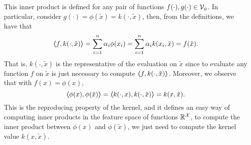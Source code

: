 %
This inner product is defined for any pair of functions $f(\cdot), g(\cdot) \in \mathcal{V}_\phi$. In particular, consider $g(\cdot) = \phi(\tilde{x}) = k(\cdot, \tilde{x})$, then, from the definitions, we have that
$$ \bm{\left\langle} f, k(\cdot, \tilde{x}) \bm{\right\rangle} = \sum_{i=1}^n \alpha_i \phi(x_i) =\sum_{i=1}^n \alpha_i k(x_i, \tilde{x}) = f(\tilde{x}) .$$
That is, $k(\cdot, \tilde{x})$ is the representative of the evaluation on $\tilde{x}$ since to evaluate any function $f$ on $\tilde{x}$ is just necessary to compute $\bm{\left\langle} f, k(\cdot, \tilde{x}) \bm{\right\rangle}$. Moreover, we observe that with $f(x) = \phi(x)$,
$$ \bm{\left\langle} \phi(x), \phi(\tilde{x}) \bm{\right\rangle} = \bm{\left\langle} k(\cdot, x), k(\cdot, \tilde{x}) \bm{\right\rangle} = k(x, \tilde{x}) .$$  
This is the reproducing property of the kernel, and it defines an easy way of computing inner products in the feature space of functions $\mathbb{R}^{\mathcal{X}}$, to compute the inner product between $\phi(x)$ and $\phi(\tilde{x})$, we just need to compute the kernel value $k(x, \tilde{x})$.


